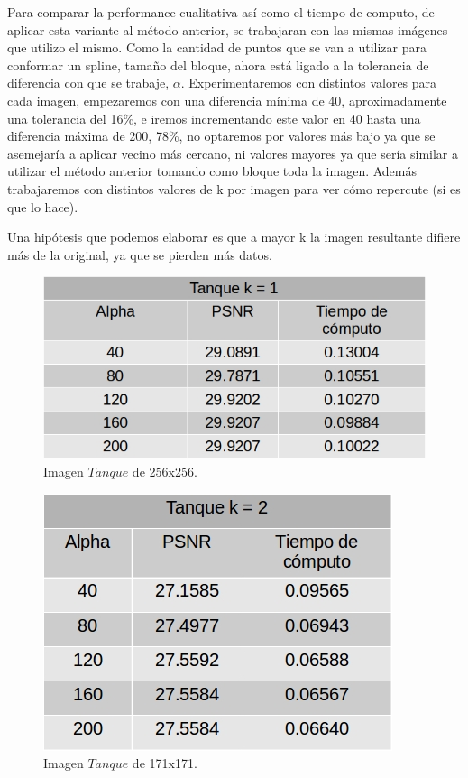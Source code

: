 \documentclass[a4paper]{article}
\begin{document}
Para comparar la performance cualitativa así como el tiempo de computo, de aplicar esta variante al método anterior, se trabajaran con las mismas imágenes que utilizo el mismo. Como la cantidad de puntos que se van a utilizar para conformar un spline, tamaño del bloque, ahora está ligado a la tolerancia de diferencia con que se trabaje, $\alpha$. Experimentaremos con distintos valores para cada imagen, empezaremos con una diferencia mínima de 40, aproximadamente una tolerancia del 16\%, e iremos incrementando este valor en 40 hasta una diferencia máxima de 200, 78\%, no optaremos por valores más bajo ya que se asemejaría a aplicar vecino más cercano, ni valores mayores ya que sería similar a utilizar el método anterior tomando como bloque toda la imagen. Además trabajaremos con distintos valores de k por imagen para ver cómo repercute (si es que lo hace).   

Una hipótesis que podemos elaborar es que a mayor k la imagen resultante difiere más de la original, ya que se pierden más datos.    



\begin{figure}[H]
    \centering
    \includegraphics[scale=0.4]{imagenes/tanque1.jpg}
    \caption{Imagen $Tanque$ de 256x256.}
	\label{tanquee}
    \end{figure}
	
\begin{figure}[H]
    \centering
    \includegraphics[scale=0.4]{imagenes/tanque2.jpg}
    \caption{Imagen $Tanque$ de 171x171.}
	\label{tanquee}
    \end{figure}
    
\end{document}
